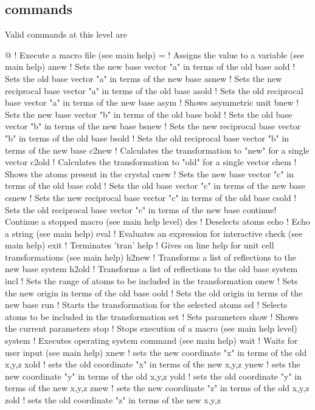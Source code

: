 \subsection*{commands}
Valid commands at this level are 
\par
\begin{MacVerbatim}
@       ! Execute a macro file (see main help)
=       ! Assigns the value to a variable (see main help)
anew    ! Sets the new base vector "a" in terms of the old base
aold    ! Sets the old base vector "a" in terms of the new base
asnew   ! Sets the new reciprocal base vector "a" in terms of the old base
asold   ! Sets the old reciprocal base vector "a" in terms of the new base
asym    ! Shows asymmetric unit
bnew    ! Sets the new base vector "b" in terms of the old base
bold    ! Sets the old base vector "b" in terms of the new base
bsnew   ! Sets the new reciprocal base vector "b" in terms of the old base
bsold   ! Sets the old reciprocal base vector "b" in terms of the new base
c2new   ! Calculates the transformation to "new" for a single vector
c2old   ! Calculates the transformation to "old" for a single vector
chem    ! Shows the atoms present in the crystal
cnew    ! Sets the new base vector "c" in terms of the old base
cold    ! Sets the old base vector "c" in terms of the new base
csnew   ! Sets the new reciprocal base vector "c" in terms of the old base
csold   ! Sets the old reciprocal base vector "c" in terms of the new base
continue! Continue a stopped macro (see main help level)
des     ! Deselects atoms
echo    ! Echo a string (see main help)
eval    ! Evaluates an expression for interactive check (see main help)
exit    ! Terminates 'tran'
help    ! Gives on line help for unit cell transformations (see main help)
h2new   ! Transforms a list of reflections to the new base system
h2old   ! Transforms a list of reflections to the old base system
incl    ! Sets the range of atoms to be included in the transformation
onew    ! Sets the new origin in terms of the old base
oold    ! Sets the old origin in terms of the new base
run     ! Starts the transformation for the selected atoms
sel     ! Selects atoms to be included in the transformation
set     ! Sets parameters
show    ! Shows the current parameters
stop    ! Stops execution of a macro (see main help level)
system  ! Executes operating system command (see main help)
wait    ! Waits for user input (see main help)
xnew    ! sets the new coordinate "x" in terms of the old x,y,z
xold    ! sets the old coordinate "x" in terms of the new x,y,z
ynew    ! sets the new coordinate "y" in terms of the old x,y,z
yold    ! sets the old coordinate "y" in terms of the new x,y,z
znew    ! sets the new coordinate "z" in terms of the old x,y,z
zold    ! sets the old coordinate "z" in terms of the new x,y,z
\end{MacVerbatim}
